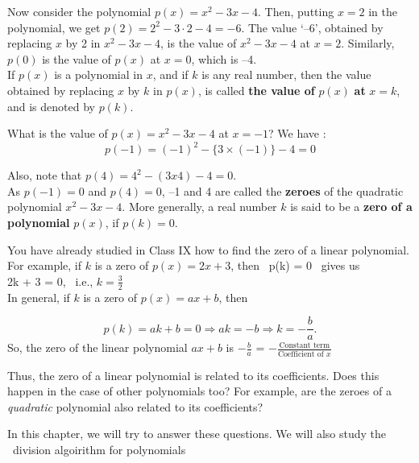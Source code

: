 \documentclass[12pt]{article}
\begin{document}
\qquad Now consider the polynomial \( p(x) = x^2 - 3x - 4 \). Then, putting \( x = 2 \) in the polynomial, we get \( p(2) = 2^2 - 3 \cdot 2 - 4 = -6 \). The value ‘–6’, obtained by replacing \( x \) by 2 in \( x^2 - 3x - 4 \), is the value of \( x^2 - 3x - 4 \) at \( x = 2 \). Similarly, \( p(0) \) is the value of \( p(x) \) at \( x = 0 \), which is –4.
\\
\qquad If \( p(x) \) is a polynomial in \( x \), and if \( k \) is any real number, then the value obtained by replacing \( x \) by \( k \) in \( p(x) \), is called \textbf{the value of} \( p(x) \) \textbf{at} \( x = k \), and is denoted by \( p(k) \).

\qquad What is the value of \( p(x) = x^2 - 3x - 4 \) at \( x = -1 \)? We have :
\vspace{-1em}
\[p(-1) = (-1)^2 - \{3 \times (-1)\} - 4 = 0 \]

Also, note that $p (4) = 4^2 - (3 x 4) - 4 = 0.$ \\

\qquad As \( p(-1) = 0 \) and \( p(4) = 0 \), –1 and 4 are called the \textbf{zeroes} of the quadratic polynomial \( x^2 - 3x - 4 \). More generally, a real number \( k \) is said to be a \textbf{zero of a polynomial} \( p(x) \), if \( p(k) = 0 \).

\qquad You have already studied in Class IX how to find the zero of a linear polynomial.  
For example, if $k$ is a zero of $p(x) = 2x + 3$, then  
\ p(k) = 0  \  gives us 
\\ 2k + 3 = 0, \ i.e., \( k = \frac{3}{2} \) 
\\

\qquad In general, if \( k \) is a zero of \( p(x) = ax + b \), then 

\[p(k) = ak + b = 0 \Rightarrow ak = -b \Rightarrow k = -\frac{b}{a}.\]
So, the zero of the linear polynomial \( ax + b \) is \(  -\frac{b}{a} \) =
\( -\frac{\text{Constant term}} {\text{Coefficient of } x}\)


\noindent
Thus, the zero of a linear polynomial is related to its coefficients. Does this
happen in the case of other polynomials too? For example, are the zeroes of a \textit{quadratic}
polynomial also related to its coefficients?

\medskip

In this chapter, we will try to answer these questions. We will also study the
\ division algoirithm for polynomials

\vspace{-2em}
\end{document}
